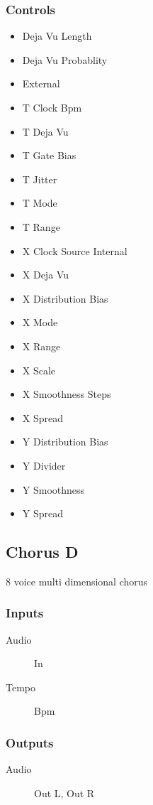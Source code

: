 \subsubsection{Controls}
\begin{itemize}
\item Deja Vu Length
\item Deja Vu Probablity
\item External
\item T Clock Bpm
\item T Deja Vu
\item T Gate Bias
\item T Jitter
\item T Mode
\item T Range
\item X Clock Source Internal
\item X Deja Vu
\item X Distribution Bias
\item X Mode
\item X Range
\item X Scale
\item X Smoothness Steps
\item X Spread
\item Y Distribution Bias
\item Y Divider
\item Y Smoothness
\item Y Spread
\end{itemize}

\subsection{Chorus D}

8 voice multi dimensional chorus



\subsubsection{Inputs}
\begin{description}
\item [Audio] In
\item [Tempo] Bpm
\end{description}

\subsubsection{Outputs}
\begin{description}
\item [Audio] Out L, Out R
\end{description}

